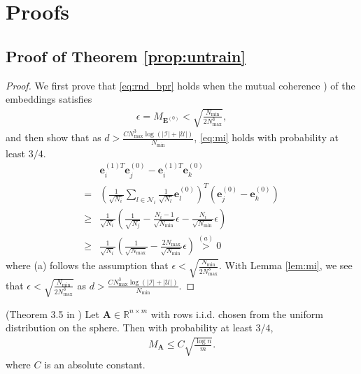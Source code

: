 \documentclass[sigconf]{acmart}
\begin{document}
\section{Proofs}

\subsection{Proof of Theorem \ref{prop:untrain}}
\begin{proof}
We first prove that \eqref{eq:rnd_bpr} holds when the mutual coherence \cite{donoho2003optimally}) of the embeddings satisfies
\begin{align} \label{eq:mi}
    \epsilon = M_{\bm{E}^{(0)}} < \sqrt{\frac{N_{\min}}{2N_{\max}^{3} }},
\end{align}
and then show that as $d > \frac{C N_{\max}^{3} \log(|\mathcal{I}| + |\mathcal{U}|)}{N_{\min}}$, \eqref{eq:mi} holds with probability at least $3/4$.
\begin{align*} 
    &\bm{e}^{(1)T}_i \bm{e}^{(0)}_j - \bm{e}_i^{(1)T} \bm{e}^{(0)}_k  \\
    = &\left( \frac{1}{\sqrt{N_i}}  \sum_{l \in \mathcal{N}_i} \frac{1}{\sqrt{N_l}} \bm{e}_l^{(0)} \right)^T (\bm{e}_j^{(0)} - \bm{e}_k^{(0)}) \\
    \geq &\frac{1}{\sqrt{N_i}}  \left(\frac{1}{\sqrt{N_j} } - \frac{N_i- 1}{\sqrt{N_{\min}}}\epsilon - \frac{N_i}{\sqrt{N_{\min}}}\epsilon  \right) \\
    \geq &\frac{1}{\sqrt{N_i}}\left(\frac{1}{\sqrt{N_{\max} } } - \frac{2N_{\max}}{\sqrt{N_{\min}}}\epsilon\right) \overset{(a)}{>} 0
\end{align*}
where (a) follows the assumption that $\epsilon < \sqrt{\frac{N_{\min}}{2N_{\max}^{3} }}$. With Lemma \ref{lem:mi}, we see that $\epsilon < \sqrt{\frac{N_{\min}}{2N_{\max}^{3} }}$ as $d > \frac{C N_{\max}^{3} \log(|\mathcal{I}| + |\mathcal{U}|)}{N_{\min}}$.
\end{proof}

\begin{lemma} \label{lem:mi} (Theorem 3.5 in \cite{Wright-Ma-2021})
    Let $\bm{A} \in \mathbb{R}^{n \times m}$ with rows i.i.d. chosen from the uniform distribution on the sphere. Then with probability at least $3/4$,
    \begin{align*}
        M_{\bm{A}} \leq C \sqrt{\frac{\log n}{m}}.
    \end{align*}
    where $C$ is an absolute constant.
\end{lemma}
\end{document}
